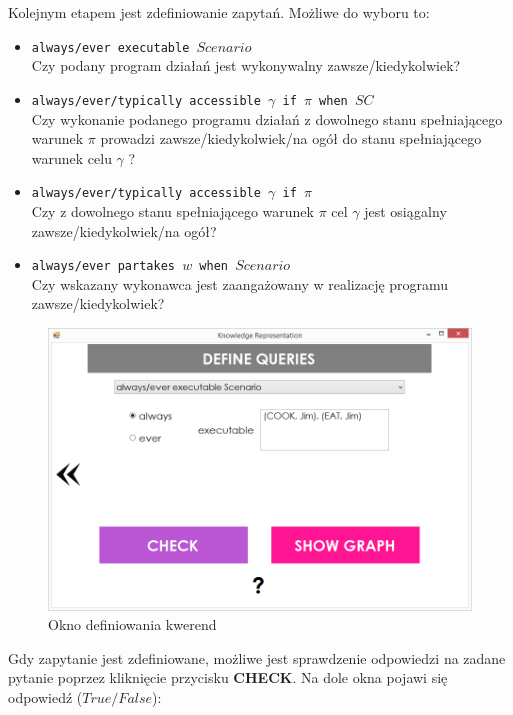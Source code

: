 \documentclass{article}
\begin{document}
Kolejnym etapem jest zdefiniowanie zapytań. Możliwe do wyboru to:
\begin{itemize}
\item {\large\texttt{always/ever executable $Scenario$}} \\
Czy podany program działań jest wykonywalny zawsze/kiedykolwiek?
\item {\large\texttt{always/ever/typically accessible $\gamma$ if $\pi$ when $SC$}}\\
Czy wykonanie podanego programu działań z dowolnego stanu spełniającego warunek $\pi$ prowadzi zawsze/kiedykolwiek/na ogół do stanu spełniającego warunek celu $\gamma$ ?
\item {\large\texttt{always/ever/typically accessible $\gamma$ if $\pi$}}\\
Czy z dowolnego stanu spełniającego warunek $\pi$ cel $\gamma$ jest osiągalny zawsze/kiedykolwiek/na ogół?
\item {\large\texttt{always/ever partakes $w$ when $Scenario$}} \\
Czy wskazany wykonawca jest zaangażowany w realizację programu zawsze/kiedykolwiek?
\end{itemize}

\newpage

\begin{figure}[H]
\centering
\includegraphics[scale=0.4]{12}
\caption{Okno definiowania kwerend}
\end{figure}


Gdy zapytanie jest zdefiniowane, możliwe jest sprawdzenie odpowiedzi na zadane pytanie poprzez kliknięcie przycisku \textbf{CHECK}. Na dole okna pojawi się odpowiedź ($True/False$):
\end{document}
